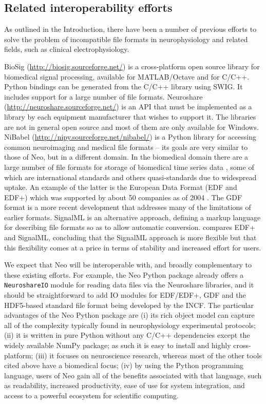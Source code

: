 \documentclass{frontiers}
\begin{document}
\subsection{Related interoperability efforts}

As outlined in the Introduction, there have been a number of previous efforts to solve the problem of incompatible file formats in neurophysiology and related fields, such as clinical electrophysiology.

BioSig (\url{http://biosig.sourceforge.net/}) is a cross-platform open source library for biomedical signal processing, available for MATLAB/Octave and for C/C++. 
Python bindings can be generated from the C/C++ library using SWIG. 
It includes support for a large number of file formats. 
Neuroshare (\url{http://neuroshare.sourceforge.net/}) is an API that must be implemented as a library by each equipment manufacturer that wishes to support it. 
The libraries are not in general open source and most of them are only available for Windows. 
NiBabel (\url{http://nipy.sourceforge.net/nibabel/}) is a Python library for accessing common neuroimaging and medical file formats -- its goals are very similar to those of Neo, but in a different domain. 
In the biomedical domain there are a large number of file formats for storage of biomedical time series data 
\citep[ECG, EEG, etc.; reviewed in][]{Schloegl2010}, some of which are international standards and others quasi-standards due to widespread uptake. An example of the latter is the European Data Format (EDF and EDF+) which was supported by about 50 companies as of 2004 \citep{Kemp2004}. The GDF format \citep{Schloegl2006} is a more recent development that addresses many of the limitations of earlier formats.
SignalML \citep{Durka2004} is an alternative approach, defining a markup language for describing file formats so as to allow automatic conversion. 
\citet{Kemp2004} compares EDF+ and SignalML, concluding that the SignalML approach is more flexible but that this flexibility comes at a price in terms of stability and increased effort for users.

We expect that Neo will be interoperable with, and broadly complementary to these existing efforts. 
For example, the Neo Python package already offers a \lstinline`NeuroshareIO` module for reading data files via the Neuroshare libraries, and it should be straightforward to add IO modules for EDF/EDF+, GDF and the HDF5-based standard file format being developed by the INCF.
The particular advantages of the Neo Python package are 
(i) its rich object model can capture all of the complexity typically found in neurophysiology experimental protocols; 
(ii) it is written in pure Python without any C/C++ dependencies except the widely available NumPy package; as such it is easy to install and highly cross-platform; 
(iii) it focuses on neuroscience research, whereas most of the other tools cited above have a biomedical focus; 
(iv) by using the Python programming language, users of Neo gain all of the benefits associated with that language, such as readability, increased productivity, ease of use for system integration, and access to a powerful ecosystem for scientific computing.
\end{document}
